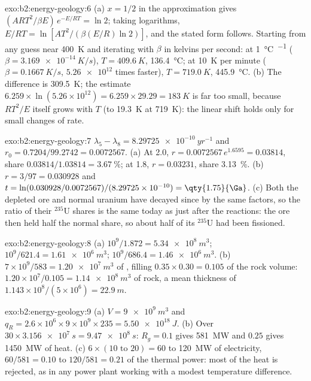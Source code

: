 \begin{solution}{exo:b2:energy-geology:6}
(a) $x = 1/2$ in the approximation gives $(ART^2/\beta E)\,e^{-E/RT} = \ln 2$; taking logarithms,
$E/RT = \ln[AT^2/(\beta(E/R)\ln 2)]$, and the stated form follows. Starting from any guess near
\qty{400}{K} and iterating with $\beta$ in kelvins per second: at \qty{1}{\celsius\per\Myr}
($\beta = \qty{3.169e-14}{K/s}$), $T = \qty{409.6}{K}$, \qty{136.4}{\celsius}; at \qty{10}{K} per
minute ($\beta = \qty{0.1667}{K/s}$, $\num{5.26e12}$ times faster), $T = \qty{719.0}{K}$,
\qty{445.9}{\celsius}. (b) The difference is \qty{309.5}{K}; the estimate $6.259 \times
\ln(5.26 \times 10^{12}) = 6.259 \times 29.29 = \qty{183}{K}$ is far too small, because $RT^2/E$
itself grows with $T$ (to \qty{19.3}{K} at \qty{719}{K}): the linear shift holds only for small
changes of rate.
\end{solution}

\begin{solution}{exo:b2:energy-geology:7}
$\lambda_5 - \lambda_8 = \qty{8.29725e-10}{yr^{-1}}$ and $r_0 = 0.7204/99.2742 = 0.0072567$.
(a) At \qty{2.0}{\Ga}, $r = 0.0072567\,e^{1.6595} = 0.03814$, share $0.03814/1.03814 =
\qty{3.67}{\percent}$; at \qty{1.8}{\Ga}, $r = 0.03231$, share \qty{3.13}{\percent}. (b) $r =
3/97 = 0.030928$ and $t = \ln(0.030928/0.0072567)/(8.29725 \times 10^{-10}) = \qty{1.75}{\Ga}$.
(c) Both the depleted ore and normal uranium have decayed since by the same factors, so the ratio of
their $^{235}$U shares is the same today as just after the reactions: the ore then held half the
normal share, so about half of its $^{235}$U had been fissioned.
\end{solution}

\begin{solution}{exo:b2:energy-geology:8}
(a) $10^9/1.872 = \qty{5.34e8}{m^3}$; $10^9/621.4 = \qty{1.61e6}{m^3}$; $10^9/686.4 =
\qty{1.46e6}{m^3}$. (b) $7 \times 10^9/583 = \qty{1.20e7}{m^3}$ of , filling
$0.35 \times 0.30 = 0.105$ of the rock volume: $1.20 \times 10^7/0.105 = \qty{1.14e8}{m^3}$ of rock,
a mean thickness of $1.143 \times 10^8/(5 \times 10^6) = \qty{22.9}{m}$.
\end{solution}

\begin{solution}{exo:b2:energy-geology:9}
(a) $V = \qty{9e9}{m^3}$ and $q_R = 2.6 \times 10^6 \times 9 \times 10^9 \times 235 =
\qty{5.50e18}{J}$. (b) Over $30 \times \qty{3.156e7}{s} = \qty{9.47e8}{s}$: $R_g = 0.1$ gives
\qty{581}{MW} and $0.25$ gives \qty{1450}{MW} of heat. (c) $6 \times (10 \text{ to } 20) = 60$ to
\qty{120}{MW} of electricity, $60/581 = 0.10$ to $120/581 = 0.21$ of the thermal power: most of the
heat is rejected, as in any power plant working with a modest temperature difference.
\end{solution}

